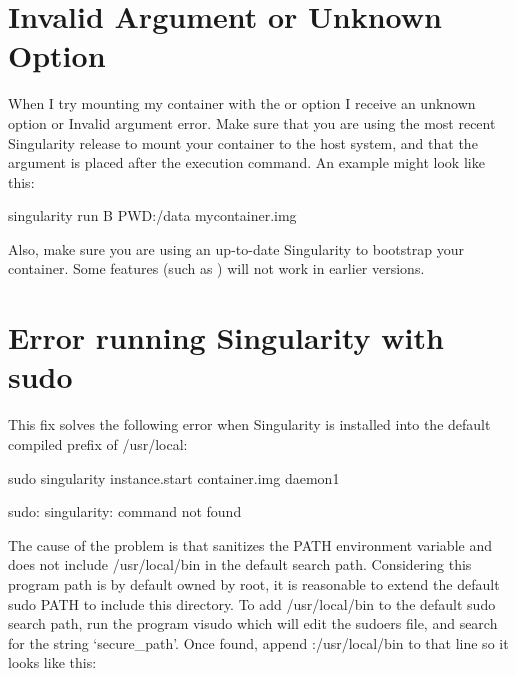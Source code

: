 \documentclass[letterpaper,10pt,english]{sphinxmanual}
\begin{document}
\section{Invalid Argument or Unknown Option}
\label{\detokenize{troubleshooting:invalid-argument-or-unknown-option}}
When I try mounting my container with the  or  option I receive an
unknown option or Invalid argument error.
Make sure that you are using the most recent Singularity release to
mount your container to the host system, and that the  argument is
placed after the execution command. An example might look like this:

%
\begin{sphinxVerbatim}[commandchars=\\\{\}]
\PYGZdl{} singularity run \PYGZhy{}B \PYGZdl{}PWD:/data my\PYGZus{}container.img
\end{sphinxVerbatim}

Also, make sure you are using an up-to-date Singularity to bootstrap
your container. Some features (such as  ) will not work in earlier
versions.


\section{Error running Singularity with sudo}
\label{\detokenize{troubleshooting:error-running-singularity-with-sudo}}
This fix solves the following error when Singularity is installed into
the default compiled prefix of /usr/local:

%
\begin{sphinxVerbatim}[commandchars=\\\{\}]
\PYGZdl{} sudo singularity instance.start container.img daemon1

sudo: singularity: command not found
\end{sphinxVerbatim}

The cause of the problem is that  sanitizes the PATH environment
variable and does not include /usr/local/bin in the default search
path. Considering this program path is by default owned by root, it is
reasonable to extend the default sudo PATH to include this directory.
To add /usr/local/bin to the default sudo search path, run the program
visudo which will edit the sudoers file, and search for the string
‘secure\_path’. Once found, append :/usr/local/bin to that line so it
looks like this:
\end{document}
